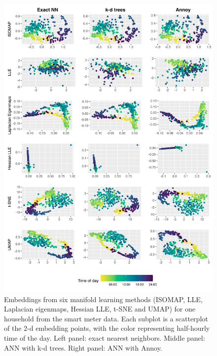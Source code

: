 \documentclass{article}
\begin{document}
\begin{figure}

{\centering \includegraphics[width=1\linewidth]{figures/tod_compare_kdtreeannoy_6methods_1id_336tow_200quantile_transpose} 

}

\caption{Embeddings from six manifold learning methods (ISOMAP, LLE, Laplacian eigenmaps, Hessian LLE, t-SNE and UMAP) for one household from the smart meter data. Each subplot is a scatterplot of the 2-d embedding points, with the color representing half-hourly time of the day. Left panel: exact nearest neighbors. Middle panel: ANN with k-d trees. Right panel: ANN with Annoy.}\label{fig:todplot}
\end{figure}
\end{document}
